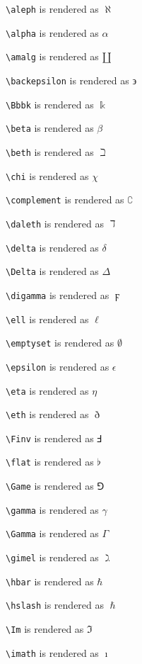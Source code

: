 \texttt{\textbackslash aleph} is rendered as $\aleph$


\texttt{\textbackslash alpha} is rendered as $\alpha$


\texttt{\textbackslash amalg} is rendered as $\amalg$


\texttt{\textbackslash backepsilon} is rendered as $\backepsilon$


\texttt{\textbackslash Bbbk} is rendered as $\Bbbk$


\texttt{\textbackslash beta} is rendered as $\beta$


\texttt{\textbackslash beth} is rendered as $\beth$


\texttt{\textbackslash chi} is rendered as $\chi$


\texttt{\textbackslash complement} is rendered as $\complement$


\texttt{\textbackslash daleth} is rendered as $\daleth$


\texttt{\textbackslash delta} is rendered as $\delta$


\texttt{\textbackslash Delta} is rendered as $\Delta$


\texttt{\textbackslash digamma} is rendered as $\digamma$


\texttt{\textbackslash ell} is rendered as $\ell$


\texttt{\textbackslash emptyset} is rendered as $\emptyset$


\texttt{\textbackslash epsilon} is rendered as $\epsilon$


\texttt{\textbackslash eta} is rendered as $\eta$


\texttt{\textbackslash eth} is rendered as $\eth$


\texttt{\textbackslash Finv} is rendered as $\Finv$


\texttt{\textbackslash flat} is rendered as $\flat$


\texttt{\textbackslash Game} is rendered as $\Game$


\texttt{\textbackslash gamma} is rendered as $\gamma$


\texttt{\textbackslash Gamma} is rendered as $\Gamma$


\texttt{\textbackslash gimel} is rendered as $\gimel$


\texttt{\textbackslash hbar} is rendered as $\hbar$


\texttt{\textbackslash hslash} is rendered as $\hslash$


\texttt{\textbackslash Im} is rendered as $\Im$


\texttt{\textbackslash imath} is rendered as $\imath$


